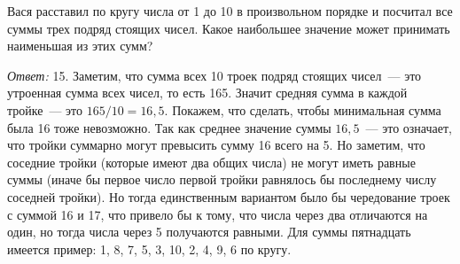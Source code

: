 Вася расставил по кругу числа от 1 до 10 в произвольном порядке и посчитал все
суммы трех подряд стоящих чисел.
Какое наибольшее значение может принимать наименьшая из этих сумм?

\solution
\emph{Ответ:} 15.
Заметим, что сумма всех 10 троек подряд стоящих чисел~--- это утроенная сумма
всех чисел, то есть 165.
Значит средняя сумма в каждой тройке~--- это $165 / 10 = 16{,}5$.
Покажем, что сделать, чтобы минимальная сумма была 16 тоже невозможно.
Так как среднее значение суммы $16{,}5$~--- это означает, что тройки суммарно
могут превысить сумму 16 всего на 5.
Но заметим, что соседние тройки (которые имеют два общих числа) не могут иметь
равные суммы (иначе бы первое число первой тройки равнялось бы последнему
числу соседней тройки).
Но тогда единственным вариантом было бы чередование троек с суммой 16 и 17,
что привело бы к тому, что числа через два отличаются на один, но тогда числа
через 5 получаются равными.
Для суммы пятнадцать имеется пример: 1, 8, 7, 5, 3, 10, 2, 4, 9, 6 по кругу.

